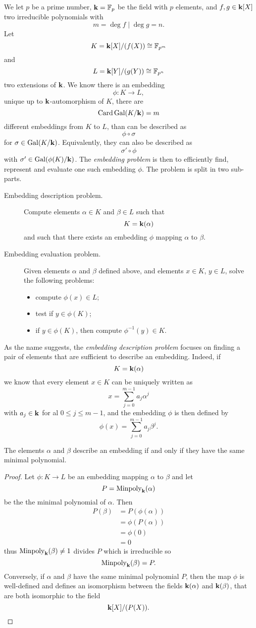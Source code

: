 We let $p$ be a prime number, $\mathbf{k} = \mathbb{F}_p$ be the field with $p$ elements,
and $f, g\in\mathbf{k}[X]$ two irreducible polynomials with
\[
  m=\deg f\mid\deg g=n.
\]
Let
\[
  K=\mathbf{k}[X]/(f(X))\cong\mathbb{F}_{p^m}
\]
and
\[
  L = \mathbf{k}[Y]/(g(Y))\cong\mathbb{F}_{p^n}
\]
two extensions of $\mathbf{k}$. We know there is an embedding
\[
  \phi:K\to L,
\]
unique up to $\mathbf{k}$-automorphism of $K$, \ie there are
\[
  \operatorname{Card}\operatorname{Gal}(K/\mathbf{k})=m
\]
different embeddings from $K$ to $L$, than can be described as
\[
  \phi\circ\sigma
\]
for $\sigma\in\operatorname{Gal}(K/\mathbf{k})$. Equivalently, they can also be described as
\[
  \sigma'\circ\phi
\]
with $\sigma'\in\operatorname{Gal}(\phi(K)/\mathbf{k})$. The \emph{embedding problem} is then to
efficiently find, represent and evaluate one such embedding $\phi$. The problem
is split in two sub-parts.
\begin{description}
  \item[Embedding description problem.] Compute elements $\alpha\in K$ and
    $\beta\in L$ such that 
    \[
      K=\mathbf{k}(\alpha)
    \]
    and such that there exists an embedding $\phi$ mapping $\alpha$ to $\beta$.
  \item[Embedding evaluation problem.] Given elements $\alpha$ and $\beta$
    defined above, and elements $x\in K$, $y\in L$, solve the
    following problems:
    \begin{itemize}
      \item compute $\phi(x)\in L$;
      \item test if $y\in\phi(K)$;
      \item if $y\in\phi(K)$, then compute $\phi^{-1}(y)\in K$.
    \end{itemize}
\end{description}
As the name suggests, the \emph{embedding description problem} focuses on
finding a pair of elements that are sufficient to describe an embedding. Indeed,
if 
\[
  K=\mathbf{k}(\alpha)
\]
we know that every element $x\in K$ can be uniquely written as 
\[
  x = \sum_{j=0}^{m-1}a_j\alpha^j
\]
with $a_j\in\mathbf{k}$ for al $0\leq j\leq m-1$, and the embedding $\phi$ is then
defined by
\[
  \phi(x) = \sum_{j=0}^{m-1}a_j\beta^j.
\]
\begin{prop}
  \label{prop:description}
 The elements $\alpha$ and $\beta$
 describe an embedding if and only if they have the same minimal polynomial. 
\end{prop}
\begin{proof}
  Let $\phi:K\to L$ be an embedding mapping $\alpha$ to $\beta$ and let 
  \[
    P = \operatorname{Minpoly}_{\mathbf{k}}(\alpha)
  \]
  be the the minimal polynomial of $\alpha$. Then 
  \begin{align*}
    P(\beta) &= P(\phi(\alpha)) \\
    &= \phi(P(\alpha))\\
    &= \phi(0) \\
    &= 0
  \end{align*}
  thus $\operatorname{Minpoly}_{\mathbf{k}}(\beta)\neq 1$ divides $P$ which is irreducible so 
  \[
\operatorname{Minpoly}_{\mathbf{k}}(\beta) = P.
  \]
 Conversely, if $\alpha$ and $\beta$ have the same minimal polynomial $P$, then the
 map $\phi$ is well-defined and defines an isomorphism between the fields $\mathbf{k}(\alpha)$ and
 $\mathbf{k}(\beta)$, that are both isomorphic to the field
 \[
   \mathbf{k}[X]/(P(X)).
 \]
\end{proof}
